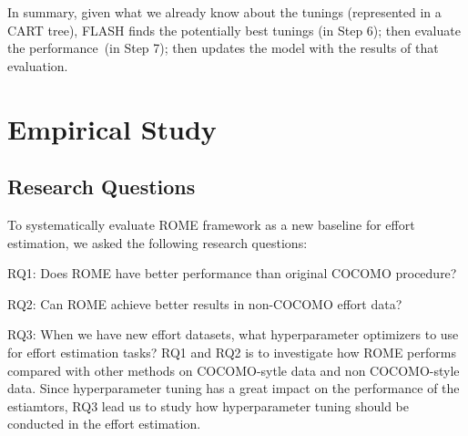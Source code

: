 

In summary,  given what we already know about the tunings (represented in a CART tree),
FLASH finds the potentially best tunings (in Step 6); then evaluate the performance~(in Step 7); 
then  updates the model with the results of that evaluation.



\section{Empirical Study} \label{sect:study} 
\subsection{Research Questions}
To systematically evaluate ROME framework as a new baseline for effort estimation,  we asked the following research questions:
\bi
\item RQ1: Does ROME have better performance than original COCOMO procedure?
\item RQ2: Can ROME achieve better results in non-COCOMO effort data?
\item RQ3: When we have new effort datasets, what hyperparameter optimizers to use for effort estimation tasks?
\ei
RQ1 and RQ2 is to investigate how ROME performs compared with other methods on COCOMO-sytle data and non COCOMO-style data. Since hyperparameter tuning has a great impact on the performance of the estiamtors, RQ3 lead us to study how hyperparameter tuning should be conducted in the effort estimation. 


